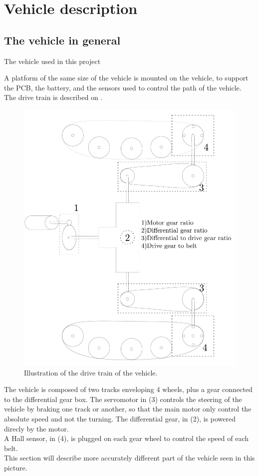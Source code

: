 \section{Vehicle description}

\subsection{The vehicle in general}

The vehicle used in this project 

A platform of the same size of the vehicle  is mounted on the vehicle, to support the PCB, the battery, and the sensors used to control the path of the vehicle.\\
The drive train is described on .

\begin{figure}[H]
	\centering
	\includegraphics[scale=0.2]{figures/vehicleDescriptionDriveTrain.pdf}
	\caption{Illustration of the drive train of the vehicle.}
	\label{vehicleDescriptionDriveTrain}
\end{figure}

The vehicle is composed of two tracks enveloping 4 wheels, plus a gear connected to the differential gear box. The servomotor in (3) controls the steering of the vehicle by braking one track or another, so that the main motor only control the absolute speed and not the turning. The differential gear, in (2), is powered direcly by the motor.\\
A Hall sensor, in (4), is plugged on each gear wheel to control the speed of each belt.\\
 This section will describe more accurately different part of the vehicle seen in this picture.\\